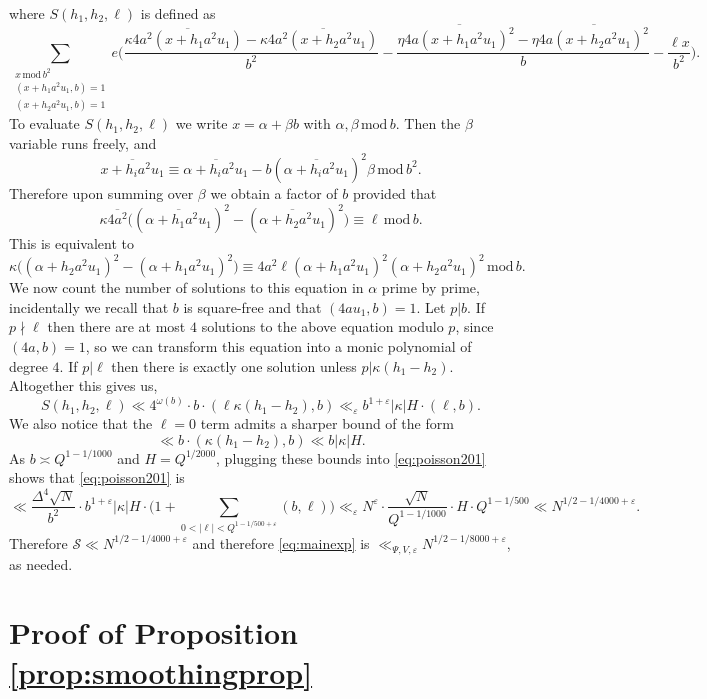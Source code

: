 \documentclass[12pt,reqno]{amsart}
\theoremstyle{plain}
\numberwithin{equation}{section}
\numberwithin{figure}{section}
\theoremstyle{plain}
\theoremstyle{definition}
\theoremstyle{remark}
\newcommand{\mmod}{\,\mathrm{mod}\,}
\begin{document}
where $S(h_1, h_2, \ell)$ is defined as
$$
\sum_{\substack{x \mmod{b^2} \\ ( x + h_1 a^2 u_1, b) = 1 \\ (x + h_2 a^2 u_1, b) = 1 }} e \Big (  \frac{\kappa \overline{4 a^2 (x + h_1 a^2 u_1)} - \kappa \overline{4 a^2 (x + h_2 a^2 u_1)}}{b^2} -  \frac{\eta \overline{4 a (x + h_1 a^2 u_1)^2} - \eta \overline{4 a (x + h_2 a^2 u_1)^2}}{b} - \frac{\ell x}{b^2} \Big ).
$$
To evaluate $S(h_1, h_2, \ell)$ we write $x = \alpha + \beta b$ with $\alpha, \beta \mmod{b}$. Then the $\beta$ variable runs freely, and
$$
\overline{x + h_i a^2 u_1} \equiv \overline{\alpha + h_i a^2 u_1} - b (\overline{\alpha + h_i a^2 u_1})^2 \beta \mmod{b^2}.
$$
Therefore upon summing over $\beta$ we obtain a factor of $b$ provided that
$$
\kappa \overline{4 a^2} \Big ( (\overline{\alpha + h_1 a^2 u_1})^2  - (\overline{\alpha + h_2 a^2 u_1})^2 \Big ) \equiv \ell \mmod{b}.
$$
This is equivalent to
$$
\kappa \Big ( (\alpha + h_2 a^2 u_1)^2 - (\alpha + h_1 a^2  u_1)^2 \Big ) 
\equiv 
4 a^2 \ell (\alpha + h_1 a^2 u_1)^2 (\alpha + h_2 a^2 u_1)^2 \mmod{b}.
$$
We now count the number of solutions to this equation in $\alpha$ prime by prime, incidentally we recall that $b$ is square-free and that $(4 a u_1, b) = 1$. Let $p | b$. 
If $p \nmid \ell$ then there are at most $4$ solutions to the above equation modulo $p$, since $(4a,b) = 1$, so we can transform this equation into a monic polynomial of degree $4$. If $p | \ell$ then there is exactly one solution unless $p | \kappa (h_1 - h_2)$. Altogether this gives us,
$$
S(h_1, h_2, \ell) \ll 4^{\omega(b)} \cdot b \cdot (\ell \kappa (h_1 - h_2), b) \ll_{\varepsilon} b^{1 + \varepsilon} |\kappa|  H \cdot (\ell, b).
$$ 
We also notice that the $\ell = 0$ term admits a sharper bound of the form
$$
\ll b \cdot (\kappa (h_1 - h_2), b) \ll b |\kappa| H .
$$
As $b \asymp Q^{1 - 1/1000}$ and $H = Q^{1/2000}$, plugging these bounds into \eqref{eq:poisson201}
shows that \eqref{eq:poisson201} is 
$$
\ll \frac{\Delta^4 \sqrt{N}}{b^2} \cdot b^{1 + \varepsilon} |\kappa| H \cdot \Big ( 1 + \sum_{0 < |\ell| < Q^{1 - 1/500 + \varepsilon}} (b,\ell) \Big ) \ll_{\varepsilon} N^{\varepsilon} \cdot \frac{\sqrt{N}}{Q^{1 - 1/1000}} \cdot H  \cdot Q^{1 - 1/500} \ll N^{1/2 - 1 / 4000 + \varepsilon}.
$$
Therefore $\mathcal{S} \ll N^{1/2 - 1 / 4000 + \varepsilon}$ and therefore \eqref{eq:mainexp} is $\ll_{\Psi, V, \varepsilon} N^{1/2 - 1 / 8000 + \varepsilon}$, as needed. 

\section{Proof of Proposition \ref{prop:smoothingprop}}
\end{document}
